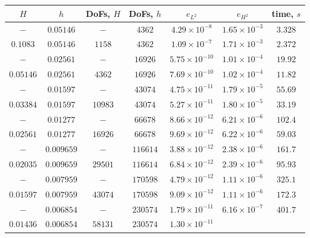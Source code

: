 \begin{table}
  \begin{center}
    {\small
    \begin{tabular}{|c|c|c|c|c|c|c|}
      \hline
        $H$ & $h$    & DoFs, $H$ & DoFs, $h$ & $e_{L^2}$ & $e_{H^2}$ & time, $s$ \\[0.2em]
      \hline
      $-$         & $0.05146$   & $-$       & $4362$    & $4.29\times 10^{-8}$
        & $1.65\times 10^{-3}$ & $3.328$ \\[0.2em]
      $0.1083$    & $0.05146$   & $1158$    & $4362$    & $1.09\times 10^{-7}$
        & $1.71\times 10^{-3}$            & $2.372$ \\[0.2em]
      $-$         & $0.02561$   & $-$       & $16926$   & $5.75\times 10^{-10}$
        & $1.01\times 10^{-4}$ & $19.92$ \\[0.2em]
      $0.05146$   & $0.02561$   & $4362$    & $16926$   & $7.69\times 10^{-10}$
        & $1.02\times 10^{-4}$           & $11.82$ \\[0.2em]
      $-$         & $0.01597$   & $-$       & $43074$   & $4.75\times 10^{-11}$
        & $1.79\times 10^{-5}$ & $55.69$ \\[0.2em]
      $0.03384$   & $0.01597$   & $10983$   & $43074$   & $5.27\times 10^{-11}$
        & $1.80\times 10^{-5}$ & $33.19$ \\[0.2em]
      $-$         & $0.01277$   & $-$       & $66678$   & $8.66\times 10^{-12}$
        & $6.21\times 10^{-6}$ & $102.4$ \\[0.2em]
      $0.02561$   & $0.01277$   & $16926$   & $66678$   & $9.69\times 10^{-12}$
        & $6.22\times 10^{-6}$ & $59.03$ \\[0.2em]
      $-$         & $0.009659$  & $-$       & $116614$  & $3.88\times 10^{-12}$
        & $2.38\times 10^{-6}$ & $161.7$ \\[0.2em]
      $0.02035$   & $0.009659$  & $29501$   & $116614$  & $6.84\times 10^{-12}$
        & $2.39\times 10^{-6}$ & $95.93$ \\[0.2em]
      $-$         & $0.007959$  & $-$       & $170598$  & $4.79\times 10^{-12}$
        & $1.11\times 10^{-6}$ & $325.1$ \\[0.2em]
      $0.01597$   & $0.007959$  & $43074$   & $170598$  & $9.09\times 10^{-12}$
        & $1.11\times 10^{-6}$ & $172.3$ \\[0.2em]
      $-$         & $0.006854$  & $-$       & $230574$  & $1.79\times 10^{-11}$
        & $6.16\times 10^{-7}$ & $401.7$ \\[0.2em]
      $0.01436$   & $0.006854$  & $58131$   & $230574$  & $1.30\times 10^{-11}$

\end{tabular}}
\end{center}
\end{table}
